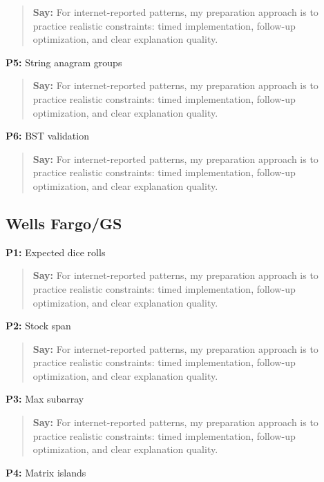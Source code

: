 \documentclass[9pt,a4paper]{article}
\begin{document}
\begin{quote}\small\textbf{Say:} For internet-reported patterns, my preparation approach is to practice realistic constraints: timed implementation, follow-up optimization, and clear explanation quality.\end{quote}
\vspace{2mm}
\textbf{P5:} String anagram groups

\begin{quote}\small\textbf{Say:} For internet-reported patterns, my preparation approach is to practice realistic constraints: timed implementation, follow-up optimization, and clear explanation quality.\end{quote}
\vspace{2mm}
\textbf{P6:} BST validation

\begin{quote}\small\textbf{Say:} For internet-reported patterns, my preparation approach is to practice realistic constraints: timed implementation, follow-up optimization, and clear explanation quality.\end{quote}
\vspace{2mm}
\subsection{Wells Fargo/GS}
\textbf{P1:} Expected dice rolls

\begin{quote}\small\textbf{Say:} For internet-reported patterns, my preparation approach is to practice realistic constraints: timed implementation, follow-up optimization, and clear explanation quality.\end{quote}
\vspace{2mm}
\textbf{P2:} Stock span

\begin{quote}\small\textbf{Say:} For internet-reported patterns, my preparation approach is to practice realistic constraints: timed implementation, follow-up optimization, and clear explanation quality.\end{quote}
\vspace{2mm}
\textbf{P3:} Max subarray

\begin{quote}\small\textbf{Say:} For internet-reported patterns, my preparation approach is to practice realistic constraints: timed implementation, follow-up optimization, and clear explanation quality.\end{quote}
\vspace{2mm}
\textbf{P4:} Matrix islands
\end{document}
